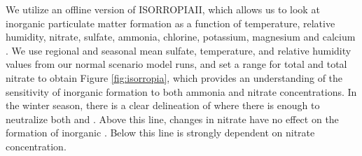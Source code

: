 \documentclass[12]{article}
\begin{document}
We utilize an offline version of ISORROPIAII, which allows us to look at inorganic particulate matter formation as a function of temperature, relative humidity, nitrate, sulfate, ammonia, chlorine, potassium, magnesium and calcium \citep{fountoukis_isorropia_2007}. We use regional and seasonal mean sulfate, temperature, and relative humidity values from our normal scenario model runs, and set a range for total  and total nitrate to obtain Figure \ref{fig:isorropia}, which provides an understanding of the sensitivity of inorganic  formation to both ammonia and nitrate concentrations. In the winter season, there is a clear delineation of where there is enough  to neutralize both  and . Above this line, changes in nitrate have no effect on the formation of inorganic . Below this line  is strongly dependent on nitrate concentration. 
\end{document}
